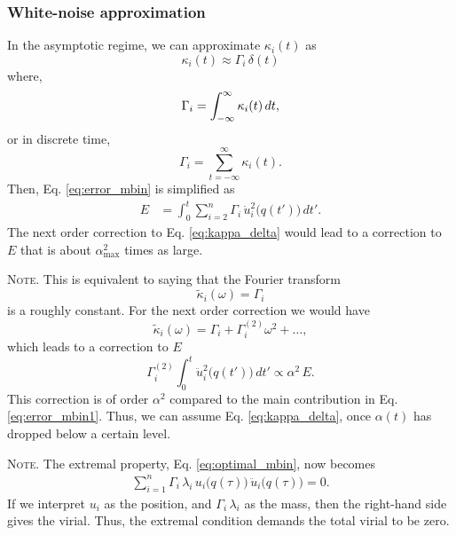 \documentclass[reprint]{revtex4-1}
\newcommand{\note}[1]{{\color{DarkGreen}\footnotesize \textsc{Note.} #1}}
\newcommand{\Err}{E}
\begin{document}
\subsubsection{White-noise approximation}



In the asymptotic regime,
we can approximate $\kappa_i(t)$ as
%
\begin{equation}
  \kappa_i(t) \approx \Gamma_i \, \delta(t)
  \label{eq:kappa_delta}
\end{equation}
%
where,
\begin{equation}
  \Gamma_i = \int_{-\infty}^\infty \kappa_i(t) \, dt,
  \notag
\end{equation}
or in discrete time,
\begin{equation}
  \Gamma_i = \sum_{t = -\infty}^\infty \kappa_i(t).
  \label{eq:Gamma_sum}
\end{equation}
%
Then, Eq. \eqref{eq:error_mbin} is simplified as
%
\begin{align}
  \Err
  &=
  \int_0^t
  \sum_{i = 2}^n
  \Gamma_i \, \dot u_i^2\bigl( q(t') \bigr) \, dt'.
  \label{eq:error_mbin1}
\end{align}
%
The next order correction to Eq. \eqref{eq:kappa_delta}
would lead to a correction to $\Err$
that is about $\alpha_{\max}^2$ times as large.


\note{This is equivalent to saying that the Fourier transform
  $$
  \tilde \kappa_i(\omega) = \Gamma_i
  $$
  is a roughly constant.
  For the next order correction we would have
  $$
  \tilde \kappa_i(\omega) = \Gamma_i + \Gamma^{(2)}_i \omega^2 + \dots,
  $$
  which leads to a correction to $\Err$
  $$
  \Gamma^{(2)}_i
  \int_0^t \ddot u_i^2\bigl( q(t') \bigr) \, dt'
  \propto
  \alpha^2 \, \Err.
  $$
  This correction is of order $\alpha^2$
  compared to the main contribution in Eq. \eqref{eq:error_mbin1}.
  Thus, we can assume Eq. \eqref{eq:kappa_delta},
  once $\alpha(t)$ has dropped below a certain level.
}

\note{
  The extremal property, Eq. \eqref{eq:optimal_mbin},
  now becomes
  \begin{align}
    \sum_{i=1}^n
      \Gamma_i \, \lambda_i \,
      u_i\bigl( q(\tau) \bigr) \,
      \ddot u_i\bigl( q(\tau) \bigr) = 0.
    \label{eq:optimal_mbin1}
  \end{align}
  If we interpret $u_i$ as the position,
  and $\Gamma_i \, \lambda_i$ as the mass,
  then the right-hand side gives the virial.
  Thus, the extremal condition demands
  the total virial to be zero.
  $$\,$$
}
\end{document}
